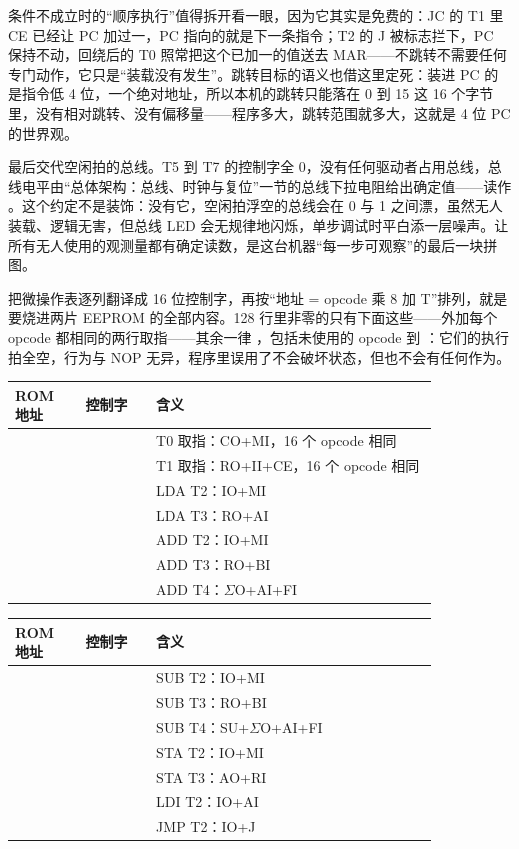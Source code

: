 条件不成立时的“顺序执行”值得拆开看一眼，因为它其实是免费的：JC 的 T1 里 CE 已经让 PC 加过一，PC 指向的就是下一条指令；T2 的 J 被标志拦下，PC 保持不动，回绕后的 T0 照常把这个已加一的值送去 MAR——不跳转不需要任何专门动作，它只是“装载没有发生”。跳转目标的语义也借这里定死：装进 PC 的是指令低 4 位，一个绝对地址，所以本机的跳转只能落在 0 到 15 这 16 个字节里，没有相对跳转、没有偏移量——程序多大，跳转范围就多大，这就是 4 位 PC 的世界观。

最后交代空闲拍的总线。T5 到 T7 的控制字全 0，没有任何驱动者占用总线，总线电平由“总体架构：总线、时钟与复位”一节的总线下拉电阻给出确定值——读作 。这个约定不是装饰：没有它，空闲拍浮空的总线会在 0 与 1 之间漂，虽然无人装载、逻辑无害，但总线 LED 会无规律地闪烁，单步调试时平白添一层噪声。让所有无人使用的观测量都有确定读数，是这台机器“每一步可观察”的最后一块拼图。

把微操作表逐列翻译成 16 位控制字，再按“地址 = opcode 乘 8 加 T”排列，就是要烧进两片 EEPROM 的全部内容。128 行里非零的只有下面这些——外加每个 opcode 都相同的两行取指——其余一律 ，包括未使用的 opcode  到 ：它们的执行拍全空，行为与 NOP 无异，程序里误用了不会破坏状态，但也不会有任何作为。

\begin{longtable}{L{0.14\linewidth}L{0.14\linewidth}L{0.56\linewidth}}
\toprule
ROM 地址 & 控制字 & 含义 \\
\midrule
{} &  & T0 取指：CO+MI，16 个 opcode 相同 \\\tablerowrule
{} &  & T1 取指：RO+II+CE，16 个 opcode 相同 \\\tablerowrule
{} &  & LDA T2：IO+MI \\\tablerowrule
{} &  & LDA T3：RO+AI \\\tablerowrule
{} &  & ADD T2：IO+MI \\\tablerowrule
{} &  & ADD T3：RO+BI \\\tablerowrule
{} &  & ADD T4：$\Sigma$O+AI+FI \\
\bottomrule
\end{longtable}

\begin{longtable}{L{0.14\linewidth}L{0.14\linewidth}L{0.56\linewidth}}
\toprule
ROM 地址 & 控制字 & 含义 \\
\midrule
{} &  & SUB T2：IO+MI \\\tablerowrule
{} &  & SUB T3：RO+BI \\\tablerowrule
{} &  & SUB T4：SU+$\Sigma$O+AI+FI \\\tablerowrule
{} &  & STA T2：IO+MI \\\tablerowrule
{} &  & STA T3：AO+RI \\\tablerowrule
{} &  & LDI T2：IO+AI \\\tablerowrule
{} &  & JMP T2：IO+J \\
\bottomrule
\end{longtable}

